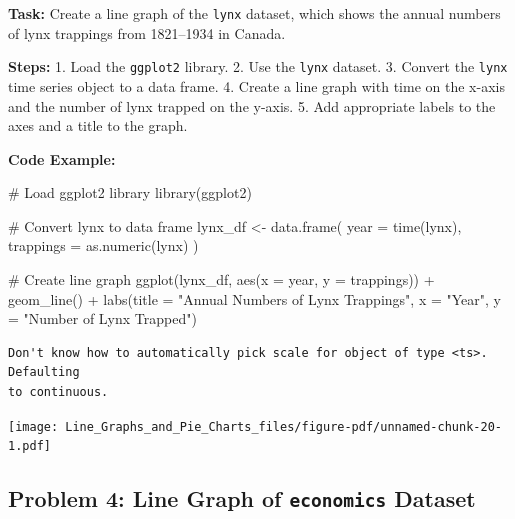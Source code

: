 \documentclass[
  letterpaper,
  DIV=11,
  numbers=noendperiod]{scrreprt}
\newenvironment{Shaded}{\begin{snugshade}}{\end{snugshade}}
\newcommand{\AttributeTok}[1]{\textcolor[rgb]{0.40,0.45,0.13}{#1}}
\newcommand{\CommentTok}[1]{\textcolor[rgb]{0.37,0.37,0.37}{#1}}
\newcommand{\FunctionTok}[1]{\textcolor[rgb]{0.28,0.35,0.67}{#1}}
\newcommand{\NormalTok}[1]{\textcolor[rgb]{0.00,0.23,0.31}{#1}}
\newcommand{\OtherTok}[1]{\textcolor[rgb]{0.00,0.23,0.31}{#1}}
\newcommand{\SpecialCharTok}[1]{\textcolor[rgb]{0.37,0.37,0.37}{#1}}
\newcommand{\StringTok}[1]{\textcolor[rgb]{0.13,0.47,0.30}{#1}}
\begin{document}
\textbf{Task:} Create a line graph of the \texttt{lynx} dataset, which
shows the annual numbers of lynx trappings from 1821--1934 in Canada.

\textbf{Steps:} 1. Load the \texttt{ggplot2} library. 2. Use the
\texttt{lynx} dataset. 3. Convert the \texttt{lynx} time series object
to a data frame. 4. Create a line graph with time on the x-axis and the
number of lynx trapped on the y-axis. 5. Add appropriate labels to the
axes and a title to the graph.

\textbf{Code Example:}

\begin{Shaded}
\begin{Highlighting}[]
\CommentTok{\# Load ggplot2 library}
\FunctionTok{library}\NormalTok{(ggplot2)}

\CommentTok{\# Convert lynx to data frame}
\NormalTok{lynx\_df }\OtherTok{\textless{}{-}} \FunctionTok{data.frame}\NormalTok{(}
  \AttributeTok{year =} \FunctionTok{time}\NormalTok{(lynx),}
  \AttributeTok{trappings =} \FunctionTok{as.numeric}\NormalTok{(lynx)}
\NormalTok{)}

\CommentTok{\# Create line graph}
\FunctionTok{ggplot}\NormalTok{(lynx\_df, }\FunctionTok{aes}\NormalTok{(}\AttributeTok{x =}\NormalTok{ year, }\AttributeTok{y =}\NormalTok{ trappings)) }\SpecialCharTok{+}
  \FunctionTok{geom\_line}\NormalTok{() }\SpecialCharTok{+}
  \FunctionTok{labs}\NormalTok{(}\AttributeTok{title =} \StringTok{"Annual Numbers of Lynx Trappings"}\NormalTok{,}
       \AttributeTok{x =} \StringTok{"Year"}\NormalTok{,}
       \AttributeTok{y =} \StringTok{"Number of Lynx Trapped"}\NormalTok{)}
\end{Highlighting}
\end{Shaded}

\begin{verbatim}
Don't know how to automatically pick scale for object of type <ts>. Defaulting
to continuous.
\end{verbatim}

\texttt{[image: Line\_Graphs\_and\_Pie\_Charts\_files/figure-pdf/unnamed-chunk-20-1.pdf]}

\subsection*{\texorpdfstring{Problem 4: Line Graph of \texttt{economics}
Dataset}{Problem 4: Line Graph of economics Dataset}}\label{problem-4-line-graph-of-economics-dataset}
\end{document}
